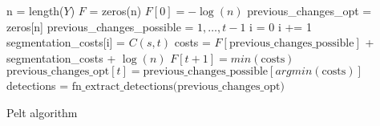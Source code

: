 \begin{algorithm}[!h]
	\begin{algorithmic}[1]
		\State n = length($Y$)
		\State $F$ = zeros(n)
		\State $F[0] = - \log(n)$
		\State previous\_changes\_opt = zeros[n]
		\State previous\_changes\_possible = $1,\dots,t-1$
		\State i = 0
		\State i += 1
		\State segmentation\_costs[i] = $C(s, t)$
		\EndFor
		\State costs = $F[\text{previous\_changes\_possible}]$ + segmentation\_costs + $\log(n)$
		\State $F[t+1] = min(\text{costs})$
		\State $\text{previous\_changes\_opt}[t] = \text{previous\_changes\_possible}[argmin(\text{costs})]$
		\EndFor
		\State detections = $\text{fn\_extract\_detections(previous\_changes\_opt)}$
		\EndFunction
	\end{algorithmic}
	\caption{Pelt algorithm}\label{alg:pelt}
\end{algorithm}